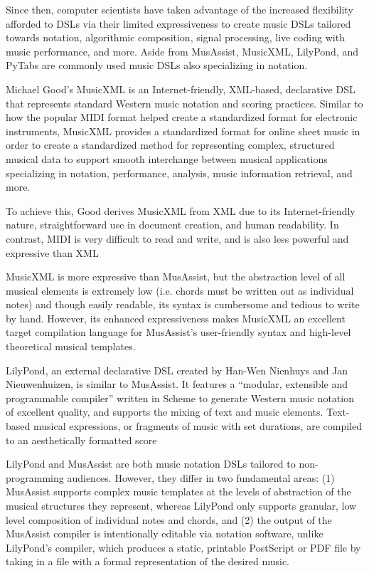 \documentclass{article}
\begin{document}
Since then, computer scientists have taken advantage of the increased flexibility afforded to DSLs via their limited expressiveness to create music DSLs tailored towards notation, algorithmic composition, signal processing, live coding with music performance, and more. Aside from MusAssist, MusicXML, LilyPond, and PyTabs are commonly used music DSLs also specializing in notation.

Michael Good’s MusicXML is an Internet-friendly, XML-based, declarative DSL that represents standard Western music notation and scoring practices. Similar to how the popular MIDI format helped create a standardized format for electronic instruments, MusicXML provides a standardized format for online sheet music in order to create a standardized method for representing complex, structured musical data to support smooth interchange between musical applications specializing in notation, performance, analysis, music information retrieval, and more.\cite{good_2013}

To achieve this, Good derives MusicXML from XML due to its Internet-friendly nature, straightforward use in document creation, and human readability. In contrast, MIDI is very difficult to read and write, and is also less powerful and expressive than XML  \cite{good_2001}

MusicXML is more expressive than MusAssist, but the abstraction level of all musical elements is extremely low (i.e. chords must be written out as individual notes) and though easily readable, its syntax is cumbersome and tedious to write by hand. However, its enhanced expressiveness makes MusicXML an excellent target compilation language for MusAssist’s user-friendly syntax and high-level theoretical musical templates.

LilyPond, an external declarative DSL created by Han-Wen Nienhuys and Jan Nieuwenhuizen, is similar to MusAssist. It features a “modular, extensible and programmable compiler” written in Scheme to generate Western music notation of excellent quality, and supports the mixing of text and music elements. Text-based musical expressions, or fragments of music with set durations, are compiled to an aesthetically formatted score \cite{nienhuys_nieuwenhuizen_2003}

LilyPond and MusAssist are both music notation DSLs tailored to non-programming audiences. However, they differ in two fundamental areas: (1) MusAssist supports complex music templates at the levels of abstraction of the musical structures they represent, whereas LilyPond only supports granular, low level composition of individual notes and chords, and (2) the output of the MusAssist compiler is intentionally editable via notation software, unlike LilyPond’s compiler, which produces a static, printable PostScript or PDF file by taking in a file with a formal representation of the desired music. 
\cite{nienhuys_nieuwenhuizen_2003}
\end{document}
